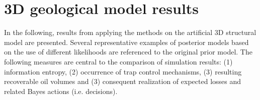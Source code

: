 				
		\section{3D geological model results}
		In the following, results from applying the methods on the artificial 3D structural model are presented. Several representative examples of posterior models based on the use of different likelihoods are referenced to the original prior model. The following measures are central to the comparison of simulation results: (1) information entropy, (2) occurrence of trap control mechanisms, (3) resulting recoverable oil volumes and (3) consequent realization of expected losses and related Bayes actions (i.e. decisions).
		
